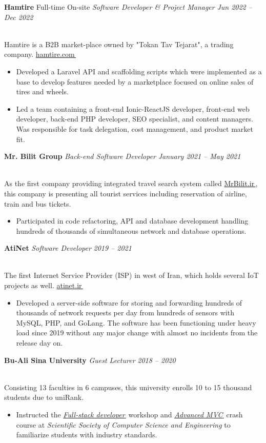 \documentclass[11pt,a4paper]{article}
\makeatletter
\let\orighref\href
\renewcommand{\href}[2]{\orighref{#1}{#2\,{\textsuperscript{\tiny{\faExternalLink}}}}}
\newcommand{\info}[1]{
    \\
    \deemph{
        \faInfoCircle
        \hspace{0.15in}
         #1
     }
     \vspace{-7pt}
}
\newcommand{\deemph}[1]{{\color{black!40}#1}}
\newcommand{\resumeItem}[1]{
  \item\small{
    {#1 \vspace{-2pt}}
  }
}
\newcommand{\resumeSubheading}[4]{
  \vspace{-2pt}\item
      \textbf{#1} \small\deemph{#2}
      \textit{\small#3} \hfill \textit{\small\deemph{#4}}
    \vspace{0pt}
}
\newcommand{\resumeItemListStart}{\begin{itemize}}
\newcommand{\resumeItemListEnd}{\end{itemize}\vspace{-5pt}}
\makeatother
\begin{document}
\begin{justify}
    \resumeSubheading
      {Hamtire}{Full-time On-site}
      {Software Developer \& Project Manager}{Jun 2022 -- Dec 2022}
      \info{Hamtire is a B2B market-place owned by "Tokan Tav Tejarat", a trading company. \href{https://hamtire.com}{hamtire.com}}
      \resumeItemListStart
        \resumeItem{Developed a Laravel API and scaffolding scripts which were implemented as a base to develop features needed by a marketplace focused on online sales of tires and wheels. }
        \resumeItem{Led a team containing a front-end Ionic-ReactJS developer, front-end web developer, back-end PHP developer, SEO specialist, and content managers. Was responsible for task delegation, cost management, and product market fit.}
        \resumeItemListEnd

    \resumeSubheading
      {Mr. Bilit Group}{}
      {Back-end Software Developer}{January 2021 -- May 2021}
      \info{As the first company providing integrated travel search system called \href{MrBilit.ir}{MrBilit.ir}, this company is presenting all tourist services including reservation of airline, train and bus tickets.}
      \resumeItemListStart
        \resumeItem{Participated in code refactoring, API and database development handling hundreds of thousands of simultaneous network and database operations.}
        \resumeItemListEnd
        
    \resumeSubheading
      {AtiNet}{}
      {Software Developer}{2019 -- 2021}
      \info{The first Internet Service Provider (ISP) in west of Iran, which holds several IoT projects as well. \href{https://atinet.ir}{atinet.ir}}
      \resumeItemListStart
        \resumeItem{Developed a server-side software for storing and forwarding hundreds of thousands of network requests per day from hundreds of sensors with MySQL, PHP, and GoLang. The software has been functioning under heavy load since 2019 without any major change with almost no incidents from the release day on.}
        \resumeItemListEnd
      
    \resumeSubheading
      {Bu-Ali Sina University}{}
      {Guest Lecturer}{2018 -- 2020}
      \info{Consisting 13 faculties in 6 campuses, this university enrolls 10 to 15 thousand students due to uniRank.}
      \resumeItemListStart
        \resumeItem{Instructed the \href{https://github.com/tayyebi/BASU-Full-Stack-98}{\emph{Full-stack developer}} workshop and \href{https://github.com/tayyebi/BASU-MVC-99}{\emph{Advanced MVC}} crash course at \emph{Scientific Society of Computer Science and Engineering} to familiarize students with industry standards. }
      \resumeItemListEnd


\end{justify}
\end{document}
